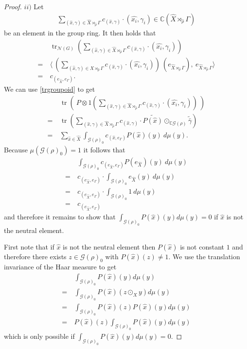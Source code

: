 \documentclass[12pt,a4paper]{scrartcl}
\theoremstyle{plain}
\theoremstyle{definition}
\newcommand{\C}{\mathbb{C}} %
\newcommand{\2}{\mathbb{Z} / 2 \mathbb{Z}}
\newcommand{\G}{\mathcal{G}}
\newcommand{\1}{\bar{1}}
\newcommand{\0}{\bar{0}}
\newcommand{\tr}{\operatorname{tr}}
\begin{document}
\begin{proof}
	$ii)$ Let 
	\begin{align*}
		\sum_{(\hat{x}, \gamma) \in \hat{X} \rtimes_{\hat{\rho}} \Gamma} c_{(\hat{x}, \gamma)} \cdot (\widehat{x_i}, \gamma_i) \in \C(\hat{X} \rtimes_{\hat{\rho}} \Gamma)
	\end{align*}
	be an element in the group ring. It then holds that
	\begin{align*}
		 &~ \tr_{\mathcal{N}(G)}(\sum_{(\hat{x}, \gamma) \in \hat{X} \rtimes_{\hat{\rho}} \Gamma} c_{(\hat{x}, \gamma)} \cdot (\widehat{x_i}, \gamma_i)) \\
		=&~ \langle ~(\sum_{(\hat{x}, \gamma) \in \hat{X} \rtimes_{\hat{\rho}} \Gamma} c_{(\hat{x}, \gamma)} \cdot (\widehat{x_i}, \gamma_i))~(e_{\hat{X} \rtimes_{\hat{\rho}} \Gamma}),~ e_{\hat{X} \rtimes_{\hat{\rho}} \Gamma} \rangle \\
		=&~ c_{(e_{\hat{X}}, e_\Gamma)}.
	\end{align*}
	We can use \ref{trgroupoid} to get
	\begin{align*}
		 &~ \tr(~ P \otimes 1 (\sum_{(\hat{x}, \gamma) \in \hat{X} \rtimes_{\hat{\rho}} \Gamma} c_{(\hat{x}, \gamma)} \cdot (\widehat{x_i}, \gamma_i))~) \\
		=&~ \tr(\sum_{(\hat{x}, \gamma) \in \hat{X} \rtimes_{\hat{\rho}} \Gamma} c_{(\hat{x}, \gamma)} \cdot \widetilde{P(\hat{x})} \odot_{\C\G(\rho)} \widetilde{\bar{\gamma}}) \\
		=&~ \sum_{\hat{x} \in \hat{X}} \int_{\mathcal{G(\rho)}_0} c_{(\hat{x}, e_\Gamma)} P(\hat{x})(y)~ d\mu(y).
	\end{align*}
	Because $\mu(\G(\rho)_0) = 1$ it follows that
	\begin{align*}
		 &~ \int_{\mathcal{G(\rho)}_0} c_{(e_{\hat{X}}, e_\Gamma)} P(e_{\hat{X}})(y) ~d\mu(y) \\
		=&~ c_{(e_{\hat{X}}, e_\Gamma)} \cdot \int_{\mathcal{G(\rho)}_0}  e_{\hat{X}}(y)~ d\mu(y) \\
		=&~ c_{(e_{\hat{X}}, e_\Gamma)} \cdot \int_{\mathcal{G(\rho)}_0}  1~ d\mu(y) \\
		=&~ c_{(e_{\hat{X}}, e_\Gamma)}
	\end{align*}
	and therefore it remains to show that $\int_{\G(\rho)_0} P(\hat{x})(y) d\mu(y) = 0$ if $\hat{x}$ is not the neutral element.
	
	First note that if $\hat{x}$ is not the neutral element then $P(\hat{x})$ is not constant $1$ and therefore there exists $z \in \G(\rho)_0$ with $P(\hat{x})(z) \neq 1$. We use the translation invariance of the Haar measure to get
	\begin{align*}
		 &~ \int_{\G(\rho)_0} P(\hat{x})(y) d\mu(y) \\
		=&~ \int_{\G(\rho)_0} P(\hat{x})(z \odot_{X} y) d\mu(y) \\
		=&~ \int_{\G(\rho)_0} P(\hat{x})(z) P(\hat{x})(y) d\mu(y) \\
		=&~ P(\hat{x})(z) \int_{\G(\rho)_0} P(\hat{x})(y) d\mu(y)
	\end{align*}
	which is only possible if $\int_{\G(\rho)_0} P(\hat{x})(y) d\mu(y) = 0$.
	

\end{proof}
\end{document}
